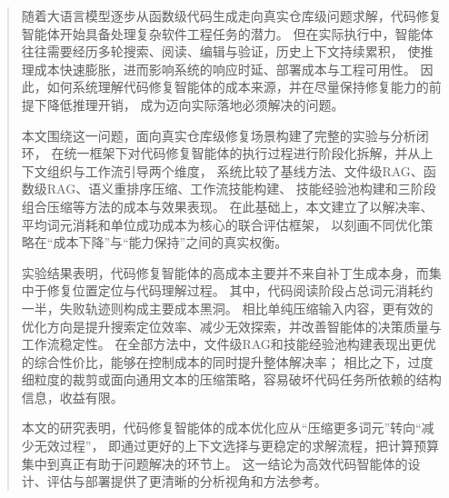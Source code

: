 

\begin{abstract}\label{abstract}

  随着大语言模型逐步从函数级代码生成走向真实仓库级问题求解，代码修复智能体开始具备处理复杂软件工程任务的潜力。
  但在实际执行中，智能体往往需要经历多轮搜索、阅读、编辑与验证，历史上下文持续累积，
  使推理成本快速膨胀，进而影响系统的响应时延、部署成本与工程可用性。
  因此，如何系统理解代码修复智能体的成本来源，并在尽量保持修复能力的前提下降低推理开销，
  成为迈向实际落地必须解决的问题。

  本文围绕这一问题，面向真实仓库级修复场景构建了完整的实验与分析闭环，
  在统一框架下对代码修复智能体的执行过程进行阶段化拆解，并从上下文组织与工作流引导两个维度，
  系统比较了基线方法、文件级RAG、函数级RAG、语义重排序压缩、工作流技能构建、
  技能经验池构建和三阶段组合压缩等方法的成本与效果表现。
  在此基础上，本文建立了以解决率、平均词元消耗和单位成功成本为核心的联合评估框架，
  以刻画不同优化策略在“成本下降”与“能力保持”之间的真实权衡。

  实验结果表明，代码修复智能体的高成本主要并不来自补丁生成本身，而集中于修复位置定位与代码理解过程。
  其中，代码阅读阶段占总词元消耗约一半，失败轨迹则构成主要成本黑洞。
  相比单纯压缩输入内容，更有效的优化方向是提升搜索定位效率、减少无效探索，并改善智能体的决策质量与工作流稳定性。
  在全部方法中，文件级RAG和技能经验池构建表现出更优的综合性价比，能够在控制成本的同时提升整体解决率；
  相比之下，过度细粒度的裁剪或面向通用文本的压缩策略，容易破坏代码任务所依赖的结构信息，收益有限。

  本文的研究表明，代码修复智能体的成本优化应从“压缩更多词元”转向“减少无效过程”，
  即通过更好的上下文选择与更稳定的求解流程，把计算预算集中到真正有助于问题解决的环节上。
  这一结论为高效代码智能体的设计、评估与部署提供了更清晰的分析视角和方法参考。
  
  
  \end{abstract}
  
